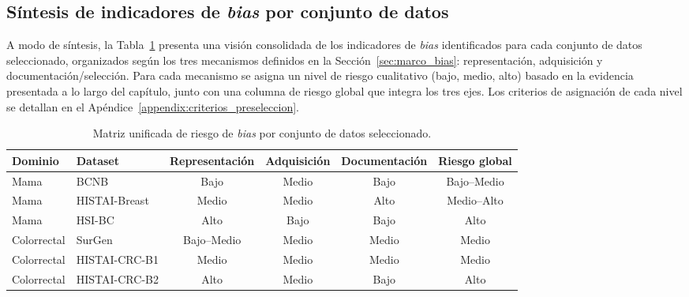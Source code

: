 \subsection{Síntesis de indicadores de \textit{bias} por conjunto de datos}
\label{sec:sintesis_bias}

A modo de síntesis, la Tabla~\ref{tab:matriz_riesgo_unificada} presenta una visión consolidada de los indicadores de \textit{bias} identificados para cada conjunto de datos seleccionado, organizados según los tres mecanismos definidos en la Sección~\ref{sec:marco_bias}: representación, adquisición y documentación/selección. Para cada mecanismo se asigna un nivel de riesgo cualitativo (bajo, medio, alto) basado en la evidencia presentada a lo largo del capítulo, junto con una columna de riesgo global que integra los tres ejes. Los criterios de asignación de cada nivel se detallan en el Apéndice~\ref{appendix:criterios_preseleccion}.

\begin{table}[htbp]
\centering
\caption{Matriz unificada de riesgo de \textit{bias} por conjunto de datos seleccionado.}
\label{tab:matriz_riesgo_unificada}
\small
\setlength{\tabcolsep}{5pt}
\begin{tabular}{llcccc}
\toprule
\textbf{Dominio} &
\textbf{Dataset} &
  \textbf{Representación} &
  \textbf{Adquisición} &
  \textbf{Documentación} &
  \textbf{Riesgo global} \\
\midrule
Mama & BCNB &
  \cellcolor{riesgobajo}Bajo &
  \cellcolor{riesgomedio}Medio &
  \cellcolor{riesgobajo}Bajo &
  \cellcolor{riesgobajo}Bajo--Medio \\
Mama & HISTAI-Breast &
  \cellcolor{riesgomedio}Medio &
  \cellcolor{riesgomedio}Medio &
  \cellcolor{riesgoalto}Alto &
  \cellcolor{riesgomedio}Medio--Alto \\
Mama & HSI-BC &
  \cellcolor{riesgoalto}Alto &
  \cellcolor{riesgobajo}Bajo &
  \cellcolor{riesgobajo}Bajo &
  \cellcolor{riesgoalto}Alto \\
Colorrectal & SurGen &
  \cellcolor{riesgobajo}Bajo--Medio &
  \cellcolor{riesgomedio}Medio &
  \cellcolor{riesgomedio}Medio &
  \cellcolor{riesgomedio}Medio \\
Colorrectal & HISTAI-CRC-B1 &
  \cellcolor{riesgomedio}Medio &
  \cellcolor{riesgomedio}Medio &
  \cellcolor{riesgomedio}Medio &
  \cellcolor{riesgomedio}Medio \\
Colorrectal & HISTAI-CRC-B2 &
  \cellcolor{riesgoalto}Alto &
  \cellcolor{riesgomedio}Medio &
  \cellcolor{riesgobajo}Bajo &
  \cellcolor{riesgoalto}Alto \\
\bottomrule
\end{tabular}
\end{table}

